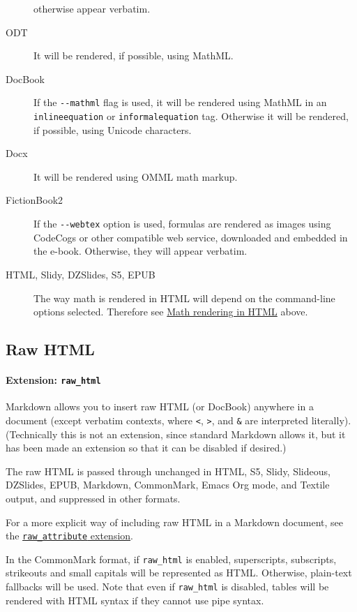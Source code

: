 \begin{description}
otherwise appear verbatim.
\item[ODT]
It will be rendered, if possible, using MathML.
\item[DocBook]
If the \texttt{-\/-mathml} flag is used, it will be rendered using
MathML in an \texttt{inlineequation} or \texttt{informalequation} tag.
Otherwise it will be rendered, if possible, using Unicode characters.
\item[Docx]
It will be rendered using OMML math markup.
\item[FictionBook2]
If the \texttt{-\/-webtex} option is used, formulas are rendered as
images using CodeCogs or other compatible web service, downloaded and
embedded in the e-book. Otherwise, they will appear verbatim.
\item[HTML, Slidy, DZSlides, S5, EPUB]
The way math is rendered in HTML will depend on the command-line options
selected. Therefore see \protect\hyperlink{math-rendering-in-html}{Math
rendering in HTML} above.
\end{description}

\hypertarget{raw-html}{%
\subsection{Raw HTML}\label{raw-html}}

\hypertarget{extension-raw_html}{%
\paragraph{\texorpdfstring{Extension:
\texttt{raw\_html}}{Extension: raw\_html}}\label{extension-raw_html}}

Markdown allows you to insert raw HTML (or DocBook) anywhere in a
document (except verbatim contexts, where \texttt{\textless{}},
\texttt{\textgreater{}}, and \texttt{\&} are interpreted literally).
(Technically this is not an extension, since standard Markdown allows
it, but it has been made an extension so that it can be disabled if
desired.)

The raw HTML is passed through unchanged in HTML, S5, Slidy, Slideous,
DZSlides, EPUB, Markdown, CommonMark, Emacs Org mode, and Textile
output, and suppressed in other formats.

For a more explicit way of including raw HTML in a Markdown document,
see the
\protect\hyperlink{extension-raw_attribute}{\texttt{raw\_attribute}
extension}.

In the CommonMark format, if \texttt{raw\_html} is enabled,
superscripts, subscripts, strikeouts and small capitals will be
represented as HTML. Otherwise, plain-text fallbacks will be used. Note
that even if \texttt{raw\_html} is disabled, tables will be rendered
with HTML syntax if they cannot use pipe syntax.

